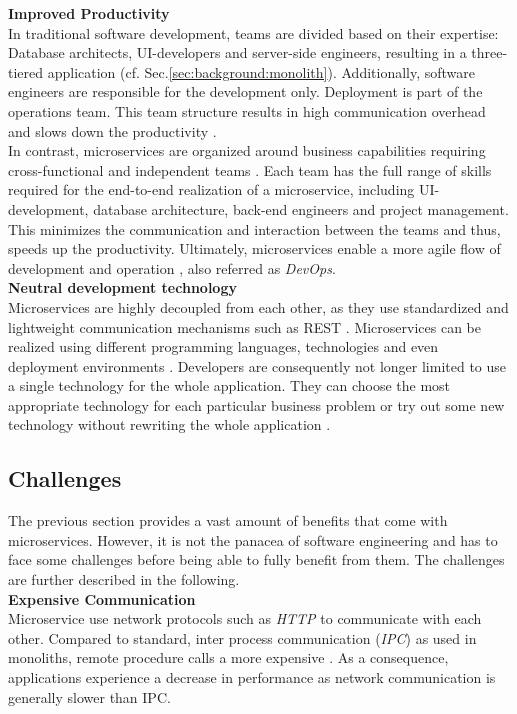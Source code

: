 \noindent
\textbf{Improved Productivity} \\
In traditional software development, teams are divided based on their expertise: Database architects, UI-developers and server-side engineers, resulting in a three-tiered application (cf. Sec.\ref{sec:background:monolith}). Additionally, software engineers are responsible for the development only. Deployment is part of the operations team. This team structure results in high communication overhead and slows down the productivity \cite{Mazlami}. \\
In contrast, microservices are organized around business capabilities requiring cross-functional and independent teams \cite{ObjectAwareAmiri}. Each team has the full range of skills required for the end-to-end realization of a microservice, including UI-development, database architecture, back-end engineers and project management. 
This minimizes the communication and interaction between the teams and thus, speeds up the productivity. Ultimately, microservices enable a more agile flow of development and operation \cite{ClassificationOfRefactoring}, also referred as \textit{DevOps}. 
\\


\noindent
\textbf{Neutral development technology} \\
Microservices are highly decoupled from each other, as they use standardized and lightweight communication mechanisms such as REST \cite{FunctionalDecompositionHeinrich}. Microservices can be realized using different programming languages, technologies and even deployment environments \cite{DataflowDrivenChen}. Developers are consequently not longer limited to use a single technology for the whole application. They can choose the most appropriate technology for each particular business problem or try out some new technology without rewriting the whole application \cite{ServiceCutter} \cite{TowardsTechnique}. 




\subsection{Challenges}
The previous section provides a vast amount of benefits that come with microservices. However, it is not the panacea of software engineering and has to face some challenges before being able to fully benefit from them. The challenges are further described in the following. \\

\noindent
\textbf{Expensive Communication}\\
Microservice use network protocols such as \textit{HTTP} to communicate with each other. Compared to standard, inter process communication (\textit{IPC}) as used in monoliths, remote procedure calls a more expensive \cite{SystematicMappingStudyMicroservice}. As a consequence, applications experience a decrease in performance as network communication is generally slower than IPC.\\

